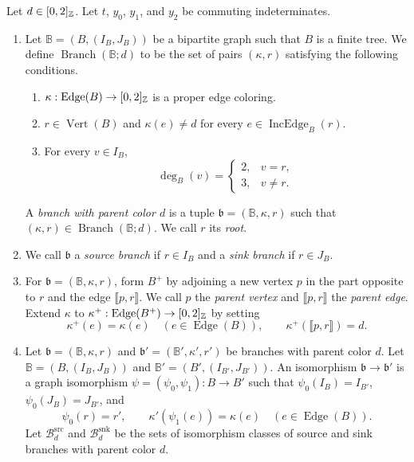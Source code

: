 \begin{definition}\label{def:colored-branches}
Let $d\in[0,2]_{\mathbb Z}$. Let $t$, $y_0$, $y_1$, and $y_2$ be commuting indeterminates.
\begin{enumerate}[font=\itshape]
\item\label{d:branch-set} Let $\mathbb B=(B,(I_B,J_B))$ be a bipartite graph such that $B$ is a finite tree.
We define $\operatorname{Branch}(\mathbb B;d)$ to be the set of pairs $(\kappa,r)$ satisfying the following conditions.
\begin{enumerate}[label=(\alph*),ref=\theenumi(\alph*),font=\itshape]
\item $\kappa:\operatorname{Edge}(B)\to[0,2]_{\mathbb Z}$ is a proper edge coloring.
\item $r\in\operatorname{Vert}(B)$ and $\kappa(e)\ne d$ for every $e\in\operatorname{IncEdge}_B(r)$.
\item For every $v\in I_{B}$,
\[
 \deg_B(v)=\begin{cases}2,&v=r,\\3,&v\ne r.\end{cases}
\]
\end{enumerate}
A \textit{branch with parent color $d$} is a tuple $\mathfrak b=(\mathbb B,\kappa,r)$ such that $(\kappa,r)\in\operatorname{Branch}(\mathbb B;d)$.
We call $r$ its \textit{root}.
\item\label{d:branch-types} We call $\mathfrak b$ a \textit{source branch} if $r\in I_{B}$ and a \textit{sink branch} if $r\in J_{B}$.
\item\label{d:branch-parent} For $\mathfrak b=(\mathbb B,\kappa,r)$, form $B^+$ by adjoining a new vertex $p$ in the part opposite to $r$ and the edge $\llbracket p,r\rrbracket$.
We call $p$ the \textit{parent vertex} and $\llbracket p,r\rrbracket$ the \textit{parent edge}.
Extend $\kappa$ to $\kappa^+:\operatorname{Edge}(B^+)\to[0,2]_{\mathbb Z}$ by setting
\[
 \kappa^+(e)=\kappa(e)\quad(e\in\operatorname{Edge}(B)),\qquad
 \kappa^+(\llbracket p,r\rrbracket)=d.
\]
\item\label{d:branch-isomorphism} Let $\mathfrak b=(\mathbb B,\kappa,r)$ and $\mathfrak b'=(\mathbb B',\kappa',r')$ be branches with parent color $d$.
Let $\mathbb B=(B,(I_B,J_B))$ and $\mathbb B'=(B',(I_{B'},J_{B'}))$.
An isomorphism $\mathfrak b\to\mathfrak b'$ is a graph isomorphism
$\psi=(\psi_0,\psi_1):B\to B'$ such that $\psi_0(I_B)=I_{B'}$, $\psi_0(J_B)=J_{B'}$, and
\[
 \psi_0(r)=r',\qquad \kappa'(\psi_1(e))=\kappa(e)\quad(e\in\operatorname{Edge}(B)).
\]
Let $\mathcal B_d^{\mathrm{src}}$ and $\mathcal B_d^{\mathrm{snk}}$ be the sets of isomorphism classes of source and sink branches with parent color $d$.

\end{enumerate}
\end{definition}
